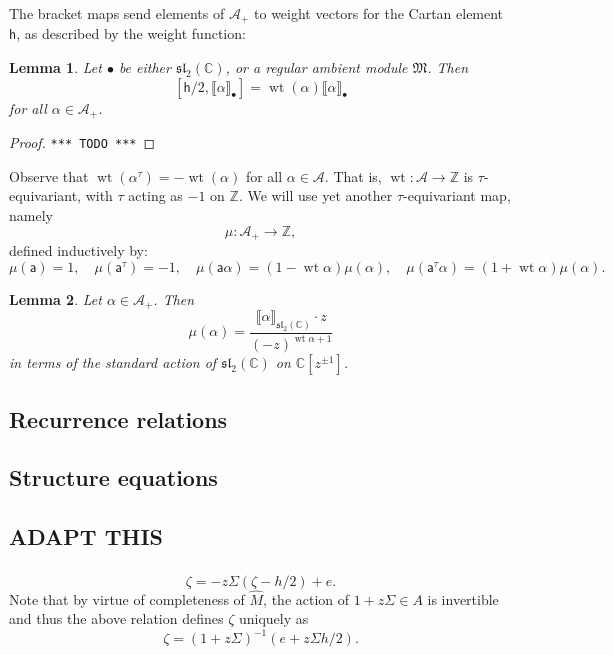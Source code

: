 \documentclass{article}
\def\MISS{\texttt{*** TODO ***}}
\def\llb{\llbracket}
\def\rrb{\rrbracket}
\def\fsl{\mathfrak{sl}}
\def\fM{\mathfrak{M}}
\def\sA{\mathcal{A}}
\def\ZZ{\mathbb{Z}}
\def\CC{\mathbb{C}}
\def\inv{\tau} %
\DeclareMathOperator{\wt}{\mathrm{wt}}
\def\a{\mathsf{a}}
\def\h{\mathsf{h}}
\newtheorem{lem}{Lemma}
\theoremstyle{definition}
\begin{document}
The bracket maps
send elements of $\sA_+$ to
weight vectors for the Cartan element $\h$,
as described by the weight function:
\begin{lem}
        Let $\bullet$ be either
        $\fsl_2(\CC)$,
        or a regular ambient module $\fM$. Then
        $$[\h/2, \llb\alpha\rrb_\bullet] = \wt(\alpha) \llb\alpha\rrb_\bullet$$
        for all $\alpha\in\sA_+$.
\end{lem}
\begin{proof}\MISS\end{proof}

Observe that $\wt(\alpha^\tau) = -\wt(\alpha)$ for
all $\alpha\in\sA$. That is, $\wt:\sA\to\ZZ$ is $\tau$-equivariant,
with $\tau$ acting as $-1$ on $\ZZ$.
We will use yet another $\tau$-equivariant map, namely
$$ \mu : \sA_+ \to \ZZ,$$
defined inductively by:
$$
\mu(\a)=1,\quad\mu(\a^\inv)=-1,\quad \mu(\a\alpha) = (1-\wt\alpha)\mu(\alpha),\quad
\mu(\a^\inv\alpha) = (1 + \wt\alpha)\mu(\alpha).
$$
\begin{lem}
        Let $\alpha \in \sA_+$. Then
        $$
         \mu(\alpha) = \frac{\llb\alpha\rrb_{\fsl_2(\CC)} \cdot z}{(-z)^{\wt\alpha + 1}}
        $$
        in terms of the standard action of $\fsl_2(\CC)$ on $\CC[z^{\pm1}]$.
\end{lem}


\subsection{Recurrence relations}

\subsection{Structure equations}

\subsection{ADAPT THIS}

\subsubsection{}
$$
\boxed{\zeta = -z\Sigma(\zeta-h/2) + e.}
$$
Note that by virtue of completeness of $\hat M$,
the action of $1 + z\Sigma \in A$ is invertible and thus the
above relation defines $\zeta$ uniquely as
$$ \zeta = (1+z\Sigma)^{-1} (e + z\Sigma h/2).$$
\end{document}
